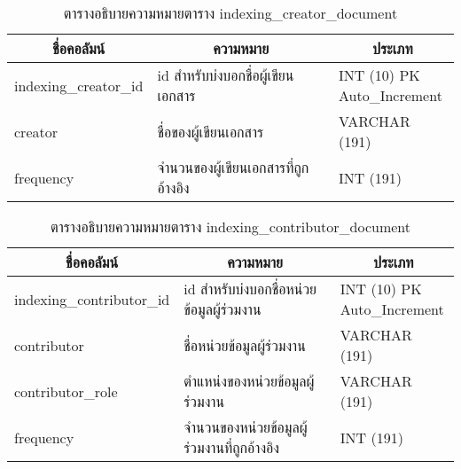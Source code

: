 \begin{table}[H]
\caption{ตารางอธิบายความหมายตาราง indexing\_creator\_document}\label{tbl:indexingcreatordocument}
\begin{tabular}{|l|l|l|}
\hline
\multicolumn{1}{|c|}{ชื่อคอลัมน์} & \multicolumn{1}{c|}{ความหมาย}       & \multicolumn{1}{c|}{ประเภท}                                                   \\ \hline
indexing\_creator\_id             & id สำหรับบ่งบอกชื่อผู้เขียนเอกสาร   & \makecell[l]{INT   (10) PK\\Auto\_Increment} \\ \hline
creator                           & ชื่อของผู้เขียนเอกสาร               & VARCHAR   (191)                                                               \\ \hline
frequency                         & จำนวนของผู้เขียนเอกสารที่ถูกอ้างอิง & INT (191)                                                                     \\ \hline
\end{tabular}
\end{table}

\begin{table}[H]
\caption{ตารางอธิบายความหมายตาราง indexing\_contributor\_document}\label{tbl:indexingcontributordocument}
\begin{tabular}{|l|l|l|}
\hline
\multicolumn{1}{|c|}{ชื่อคอลัมน์} & \multicolumn{1}{c|}{ความหมาย}              & \multicolumn{1}{c|}{ประเภท}                                                   \\ \hline
indexing\_contributor\_id         & id สำหรับบ่งบอกชื่อหน่วยข้อมูลผู้ร่วมงาน   & \makecell[l]{INT   (10) PK\\Auto\_Increment} \\ \hline
contributor                       & ชื่อหน่วยข้อมูลผู้ร่วมงาน                  & VARCHAR   (191)                                                               \\ \hline
contributor\_role                 & ตำแหน่งของหน่วยข้อมูลผู้ร่วมงาน            & VARCHAR   (191)                                                               \\ \hline
frequency                         & จำนวนของหน่วยข้อมูลผู้ร่วมงานที่ถูกอ้างอิง & INT (191)                                                                     \\ \hline
\end{tabular}
\end{table}

